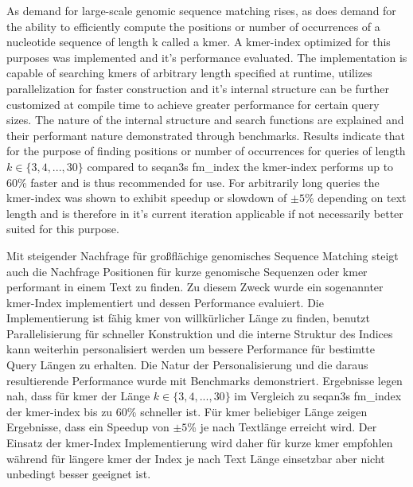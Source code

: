 \begin{abstractEN}
As demand for large-scale genomic sequence matching rises, as does
demand for the ability to efficiently compute the positions or number of occurrences
of a nucleotide sequence of length k called a kmer. A kmer-index optimized for this
purposes was implemented and it's performance evaluated. The implementation
is capable of searching kmers of arbitrary length specified at runtime,
utilizes parallelization for faster construction and it's internal
structure can be further customized at compile time to achieve greater
performance for certain query sizes. The nature of the internal structure
and search functions are explained and their performant nature demonstrated
through benchmarks. Results indicate that for the purpose of finding
positions or number of occurrences for queries of
length $k\in\{3,4,...,30\}$ compared to seqan3s fm\_index the kmer-index
performs up to 60\% faster and is thus recommended for use. For arbitrarily
long queries the kmer-index was shown to exhibit speedup or slowdown
of $\pm5$\% depending on text length and is therefore in it's current
iteration applicable if not necessarily better suited for this purpose.
\end{abstractEN}
\vfill

\begin{abstractDE}
Mit steigender Nachfrage f\"ur gro\ss fl\"achige genomisches Sequence Matching steigt
auch die Nachfrage Positionen f\"ur kurze genomische Sequenzen oder kmer performant
in einem Text zu finden. Zu diesem Zweck wurde ein sogenannter kmer-Index implementiert
und dessen Performance evaluiert. Die Implementierung ist f\"ahig kmer von willk\"urlicher
L\"ange zu finden, benutzt Parallelisierung f\"ur schneller Konstruktion und die interne
Struktur des Indices kann weiterhin personalisiert werden um bessere Performance
f\"ur bestimtte Query L\"angen zu erhalten. Die Natur der Personalisierung und die daraus 
resultierende Performance wurde mit Benchmarks demonstriert. Ergebnisse legen nah, 
dass f\"ur kmer der L\"ange $k\in\{3,4,...,30\}$ im Vergleich zu seqan3s fm\_index der 
kmer-index bis zu 60\% schneller ist. F\"ur kmer beliebiger L\"ange zeigen Ergebnisse, 
dass ein Speedup von $\pm5$\% je nach Textl\"ange erreicht wird. Der Einsatz der kmer-Index
Implementierung wird daher f\"ur kurze kmer empfohlen w\"ahrend f\"ur l\"angere kmer der Index 
je nach Text L\"ange einsetzbar aber nicht unbedingt besser geeignet ist.
\end{abstractDE}
\vfill


